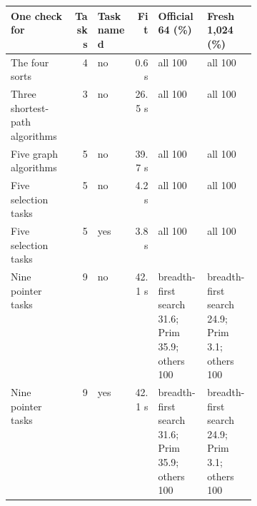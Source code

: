 \begin{tabular}{lrlrp{0.2\linewidth}p{0.2\linewidth}}\toprule
One check for & Tasks & Task named & Fit & Official 64 (\%) & Fresh 1,024 (\%) \\\midrule
The four sorts & 4 & no & 0.6 s & all 100 & all 100 \\
Three shortest-path algorithms & 3 & no & 26.5 s & all 100 & all 100 \\
Five graph algorithms & 5 & no & 39.7 s & all 100 & all 100 \\
Five selection tasks & 5 & no & 4.2 s & all 100 & all 100 \\
Five selection tasks & 5 & yes & 3.8 s & all 100 & all 100 \\
Nine pointer tasks & 9 & no & 42.1 s & breadth-first search 31.6; Prim 35.9; others 100 & breadth-first search 24.9; Prim 3.1; others 100 \\
Nine pointer tasks & 9 & yes & 42.1 s & breadth-first search 31.6; Prim 35.9; others 100 & breadth-first search 24.9; Prim 3.1; others 100 \\
\bottomrule\end{tabular}

